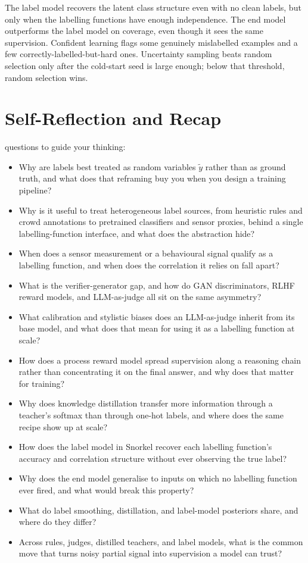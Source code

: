  The label model recovers the latent class structure even with no clean labels, but only when the labelling functions have enough independence. The end model outperforms the label model on coverage, even though it sees the same supervision. Confident learning flags some genuinely mislabelled examples and a few correctly-labelled-but-hard ones. Uncertainty sampling beats random selection only after the cold-start seed is large enough; below that threshold, random selection wins.


\fi
\newpage
\section{Self-Reflection and Recap}

 questions to guide your thinking:
\begin{itemize}
    \item Why are labels best treated as random variables $\tilde{y}$ rather than as ground truth, and what does that reframing buy you when you design a training pipeline?
    \item Why is it useful to treat heterogeneous label sources, from heuristic rules and crowd annotations to pretrained classifiers and sensor proxies, behind a single labelling-function interface, and what does the abstraction hide?
    \item When does a sensor measurement or a behavioural signal qualify as a labelling function, and when does the correlation it relies on fall apart?
    \item What is the verifier-generator gap, and how do GAN discriminators, RLHF reward models, and LLM-as-judge all sit on the same asymmetry?
    \item What calibration and stylistic biases does an LLM-as-judge inherit from its base model, and what does that mean for using it as a labelling function at scale?
    \item How does a process reward model spread supervision along a reasoning chain rather than concentrating it on the final answer, and why does that matter for training?
    \item Why does knowledge distillation transfer more information through a teacher's softmax than through one-hot labels, and where does the same recipe show up at scale?
    \item How does the label model in Snorkel recover each labelling function's accuracy and correlation structure without ever observing the true label?
    \item Why does the end model generalise to inputs on which no labelling function ever fired, and what would break this property?
    \item What do label smoothing, distillation, and label-model posteriors share, and where do they differ?
    \item Across rules, judges, distilled teachers, and label models, what is the common move that turns noisy partial signal into supervision a model can trust?
\end{itemize}

